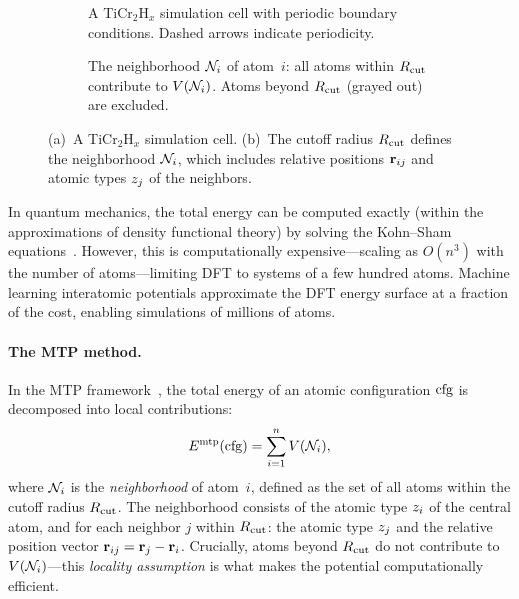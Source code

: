 \begin{figure}[t]
\centering
\begin{subfigure}[t]{0.48\textwidth}
  \centering
  \resizebox{\linewidth}{!}{}
  \caption{A TiCr$_2$H$_x$ simulation cell with periodic boundary
    conditions. Dashed arrows indicate periodicity.}
  \label{fig:simulation-cell-3d}
\end{subfigure}
\hfill
\begin{subfigure}[t]{0.48\textwidth}
  \centering
  \resizebox{\linewidth}{!}{}
  \caption{The neighborhood $\mathcal{N}_{i}$ of atom~$i$: all atoms within
    $R_{\mathrm{cut}}$ contribute to $V(\mathcal{N}_{i})$. Atoms beyond
    $R_{\mathrm{cut}}$ (grayed out) are excluded.}
  \label{fig:simulation-cell-cutoff}
\end{subfigure}
\caption{(a)~A TiCr$_2$H$_x$ simulation cell. (b)~The cutoff radius
  $R_{\mathrm{cut}}$ defines the neighborhood $\mathcal{N}_{i}$, which
  includes relative positions $\mathbf{r}_{ij}$ and atomic types $z_j$
  of the neighbors.}
\label{fig:simulation-cell}
\end{figure}

In quantum mechanics, the total energy can be computed exactly (within
the approximations of density functional theory) by solving the
Kohn--Sham equations~\cite{kohn1965dft}. However, this is
computationally expensive---scaling as $O(n^3)$ with the number of
atoms---limiting DFT to systems of a few hundred atoms. Machine learning
interatomic potentials approximate the DFT energy surface at a fraction
of the cost, enabling simulations of millions of atoms.

\paragraph{The MTP method.}
In the MTP framework~\cite{shapeev2016mtp}, the total energy of an
atomic configuration $\mathrm{cfg}$ is decomposed into local contributions:
%
\begin{equation}\label{eq:mtp-energy}
  E^{\mathrm{mtp}}(\mathrm{cfg}) = \sum_{i=1}^{n} V(\mathcal{N}_{i}),
\end{equation}
%
where $\mathcal{N}_{i}$ is the \emph{neighborhood} of atom~$i$, defined as
the set of all atoms within the cutoff radius $R_{\mathrm{cut}}$. The
neighborhood consists of the atomic type $z_i$ of the central
atom, and for each neighbor $j$ within $R_{\mathrm{cut}}$: the atomic type
$z_j$ and the relative position vector
$\mathbf{r}_{ij} = \mathbf{r}_j - \mathbf{r}_i$. Crucially, atoms beyond $R_{\mathrm{cut}}$
do not contribute to $V(\mathcal{N}_{i})$---this \emph{locality
assumption} is what makes the potential computationally efficient.

